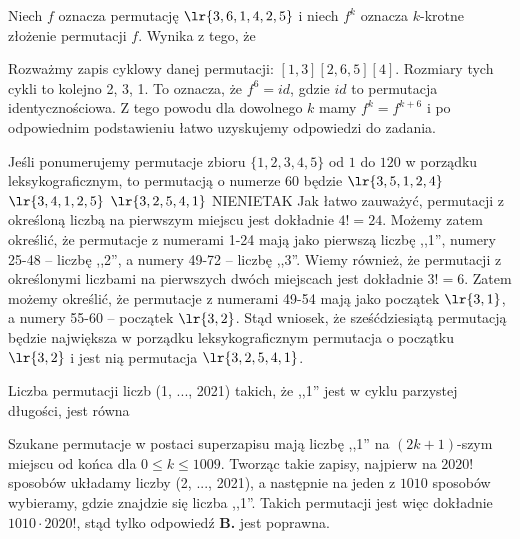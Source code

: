 \begin{solutions}
    \sol Niech $f$ oznacza permutację $\lr{3, 6, 1, 4, 2, 5}$ i niech $f^k$ oznacza $k$-krotne złożenie permutacji $f$. Wynika z tego, że

    Rozważmy zapis cyklowy danej permutacji: $[1, 3][2, 6, 5][4]$. Rozmiary tych cykli to kolejno 2, 3, 1. To oznacza, że $f^6 = id$, gdzie $id$ to permutacja identycznościowa. Z tego powodu dla dowolnego $k$ mamy $f^k = f^{k + 6}$ i po odpowiednim podstawieniu łatwo uzyskujemy odpowiedzi do zadania.

    \sol Jeśli ponumerujemy permutacje zbioru $\{1, 2, 3, 4, 5\}$ od $1$ do $120$ w porządku leksykograficznym, to permutacją o numerze $60$ będzie
    \answerss
    {$\lr{3, 5, 1, 2, 4}$}
    {$\lr{3, 4, 1, 2, 5}$}
    {$\lr{3, 2, 5, 4, 1}$}
    {NIE}{NIE}{TAK}
    Jak łatwo zauważyć, permutacji z określoną liczbą na pierwszym miejscu jest dokładnie $4!=24$. Możemy zatem określić, że permutacje z numerami 1-24 mają jako pierwszą liczbę ,,1'', numery 25-48 -- liczbę ,,2'', a numery 49-72 -- liczbę ,,3''. Wiemy również, że permutacji z określonymi liczbami na pierwszych dwóch miejscach jest dokładnie $3!=6$. Zatem możemy określić, że permutacje z numerami 49-54 mają jako początek $\lr{3, 1}$, a numery 55-60 -- początek $\lr{3, 2}$. Stąd wniosek, że sześćdziesiątą permutacją będzie największa w porządku leksykograficznym permutacja o początku $\lr{3, 2}$ i jest nią permutacja $\lr{3, 2, 5, 4, 1}$. 

    \sol Liczba permutacji liczb (1, ..., 2021) takich, że ,,1'' jest w cyklu parzystej długości, jest równa

    Szukane permutacje w postaci superzapisu mają liczbę ,,1'' na $(2k+1)$-szym miejscu od końca dla $0 \leq k \leq 1009$. Tworząc takie zapisy, najpierw na $2020!$ sposobów układamy liczby (2, ..., 2021), a następnie na jeden z $1010$ sposobów wybieramy, gdzie znajdzie się liczba ,,1''. Takich permutacji jest więc dokładnie $1010 \cdot 2020!$, stąd tylko odpowiedź \textbf{B.} jest poprawna.


\end{solutions}
